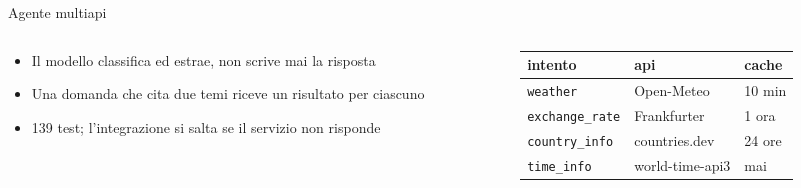 \documentclass[aspectratio=169,11pt]{beamer}
\begin{document}
\begin{frame}{Agente multiapi}
\begin{columns}[t,onlytextwidth]
\begin{column}{0.44\textwidth}
\scriptsize
\vspace{-3.5em}
\begin{itemize}\setlength\itemsep{1pt}
  \item Il modello classifica ed estrae, non scrive mai la risposta
  \item Una domanda che cita due temi riceve un risultato per ciascuno
  \item 139 test; l'integrazione si salta se il servizio non risponde
\end{itemize}
\end{column}
\begin{column}{0.52\textwidth}
\centering\scriptsize\renewcommand{\arraystretch}{0.95}
\begin{tabular}{@{}lll@{}}
\toprule
\textbf{intento} & \textbf{api} & \textbf{cache} \\
\midrule
\texttt{weather} & Open-Meteo & 10 min \\
\texttt{exchange\_rate} & Frankfurter & 1 ora \\
\texttt{country\_info} & countries.dev & 24 ore \\
\texttt{time\_info} & world-time-api3 & mai \\
\bottomrule
\end{tabular}
\end{column}
\end{columns}
\end{frame}
\end{document}
